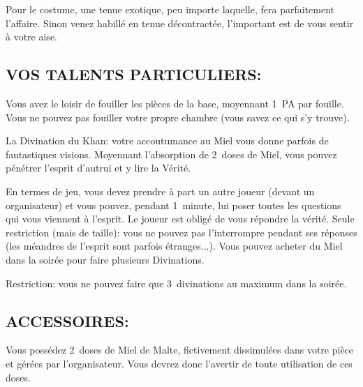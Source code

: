 \documentclass[14pt,twocolumn]{extarticle}
\begin{document}
Pour le costume, une tenue \og exotique\fg{}, peu importe laquelle, fera
parfaitement l'affaire. Sinon venez habillé en tenue décontractée, l'important
est de vous sentir à votre aise.


\subsection{VOS TALENTS PARTICULIERS:}

Vous avez le loisir de fouiller les pièces de la base, moyennant 1~PA par
fouille. Vous ne pouvez pas fouiller votre propre chambre (vous savez ce qui
s'y trouve).

La Divination du Khan: votre accoutumance au Miel vous donne parfois de
fantastiques visions. Moyennant l'absorption de 2~doses de Miel, vous pouvez
pénétrer l'esprit d'autrui et y lire la Vérité.

En termes de jeu, vous devez prendre à part un autre joueur (devant un
organisateur) et vous pouvez, pendant 1~minute, lui poser toutes les questions
qui vous viennent à l'esprit. Le joueur est obligé de vous répondre la vérité.
Seule restriction (mais de taille): vous ne pouvez pas l'interrompre pendant
ses réponses (les méandres de l'esprit sont parfois étranges...). Vous pouvez
acheter du Miel dans la soirée pour faire plusieurs Divinations.

Restriction: vous ne pouvez faire que 3~divinations au maximum dans la
soirée.

\subsection{ACCESSOIRES:}

Vous possédez 2~doses de Miel de Malte, fictivement dissimulées dans votre
pièce et gérées par l'organisateur. Vous devrez donc l'avertir de toute
utilisation de ces doses.
\end{document}

